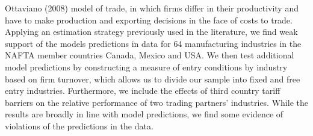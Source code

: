 Ottaviano (2008) model of trade, in which firms differ in their 
productivity and have to make production and exporting decisions in the face of 
costs to trade. Applying an estimation strategy previously used in the literature,
we find weak support of the models predictions in data for 64 manufacturing industries
in the NAFTA member countries Canada, Mexico and USA. We then test additional 
model predictions by constructing a measure of entry conditions by industry based
on firm turnover, which allows us to divide our sample into fixed and free entry
industries. Furthermore, we include the effects of third country tariff barriers
on the relative performance of two trading partners' industries. While the results
are broadly in line with model predictions, we find some evidence of violations
of the predictions in the data.